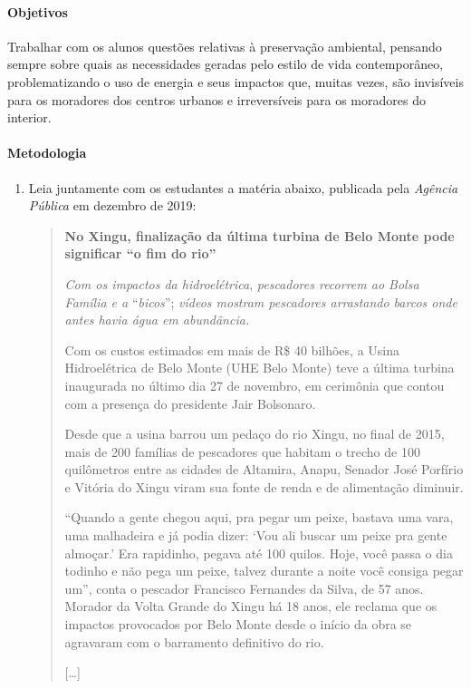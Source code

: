 \documentclass[12pt]{extarticle}
\begin{document}
\paragraph{Objetivos}
Trabalhar com os alunos questões relativas à preservação ambiental,
pensando sempre sobre quais as necessidades geradas pelo estilo de
vida contemporâneo, problematizando o uso de energia e seus impactos
que, muitas vezes, são invisíveis para os moradores dos centros
urbanos e irreversíveis para os moradores do interior.

\paragraph{Metodologia}
  \begin{enumerate}
\item Leia juntamente com os estudantes a matéria abaixo, publicada pela
    \emph{Agência Pública} em dezembro de 2019:

\begin{quote}
\textbf{No Xingu, finalização da última turbina de Belo Monte pode
significar ``o fim do rio''}

\emph{Com os impactos da hidroelétrica}, \emph{pescadores recorrem
ao Bolsa Família e a} ``\emph{bicos}''; \emph{vídeos mostram
pescadores arrastando barcos onde antes havia água em abundância.}

Com os custos estimados em mais de R\$ 40 bilhões, a Usina
Hidroelétrica de Belo Monte (UHE Belo Monte) teve a última turbina
inaugurada no último dia 27 de novembro, em cerimônia que contou com
a presença do presidente Jair Bolsonaro.

Desde que a usina barrou um pedaço do rio Xingu, no final de 2015,
mais de 200 famílias de pescadores que habitam o trecho de 100
quilômetros entre as cidades de Altamira, Anapu, Senador José
Porfírio e Vitória do Xingu viram sua fonte de renda e de
alimentação diminuir.

``Quando a gente chegou aqui, pra pegar um peixe, bastava uma vara,
uma malhadeira e já podia dizer: `Vou ali buscar um peixe pra gente
almoçar.' Era rapidinho, pegava até 100 quilos. Hoje, você passa o
dia todinho e não pega um peixe, talvez durante a noite você consiga
pegar um'', conta o pescador Francisco Fernandes da Silva, de 57
anos. Morador da Volta Grande do Xingu há 18 anos, ele reclama que
os impactos provocados por Belo Monte desde o início da obra se
agravaram com o barramento definitivo do rio.

{[}\ldots{}{]}


\end{quote}
\end{enumerate}
\end{document}

